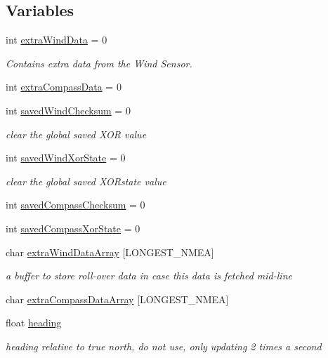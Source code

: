 \subsection*{\-Variables}
\begin{DoxyCompactItemize}
\item 
int \hyperlink{group__group1_gaf9d919ceea98cf74d8ee327ca87871ee}{extra\-Wind\-Data} = 0
\begin{DoxyCompactList}\small\item\em \-Contains extra data from the \-Wind \-Sensor. \end{DoxyCompactList}\item 
int \hyperlink{group__group1_gaafded9aee7842e71393cafc5ac68d921}{extra\-Compass\-Data} = 0
\item 
int \hyperlink{group__group1_gaf7ce3159cdebccf941f8db4e70f5764e}{saved\-Wind\-Checksum} = 0
\begin{DoxyCompactList}\small\item\em clear the global saved \-X\-O\-R value \end{DoxyCompactList}\item 
int \hyperlink{group__group1_gabc070e9e6f6449471852bd233593d1d2}{saved\-Wind\-Xor\-State} = 0
\begin{DoxyCompactList}\small\item\em clear the global saved \-X\-O\-Rstate value \end{DoxyCompactList}\item 
int \hyperlink{group__group1_ga6e28e651127135816788318d7b473dc8}{saved\-Compass\-Checksum} = 0
\item 
int \hyperlink{group__group1_ga766482b676879097212dc7aba1450aa0}{saved\-Compass\-Xor\-State} = 0
\item 
char \hyperlink{group__group1_ga5a0e345949d7a23900298d33d0be150c}{extra\-Wind\-Data\-Array} \mbox{[}\-L\-O\-N\-G\-E\-S\-T\-\_\-\-N\-M\-E\-A\mbox{]}
\begin{DoxyCompactList}\small\item\em a buffer to store roll-\/over data in case this data is fetched mid-\/line \end{DoxyCompactList}\item 
char \hyperlink{group__group1_ga87dbc2b6143e295eae5c571f1b5f460d}{extra\-Compass\-Data\-Array} \mbox{[}\-L\-O\-N\-G\-E\-S\-T\-\_\-\-N\-M\-E\-A\mbox{]}
\item 
float \hyperlink{group__group1_gac5682e48513a771560df50e3b213e61a}{heading}
\begin{DoxyCompactList}\small\item\em heading relative to true north, do not use, only updating 2 times a second \end{DoxyCompactList}\item 

\end{DoxyCompactItemize}
